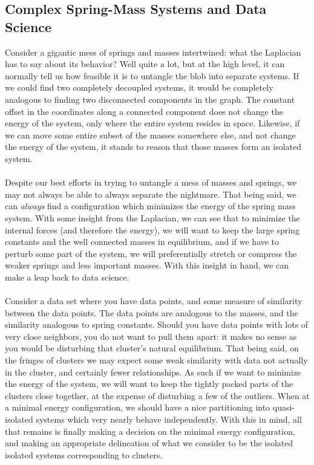 \subsection{Complex Spring-Mass Systems and Data Science}
Consider a gigantic mess of springs and masses intertwined: what the
Laplacian has to say about its behavior? Well quite a lot, but at the
high level, it can normally tell us how feasible it is to untangle the
blob into separate systems. If we could find two completely decoupled
systems, it would be completely analogous to finding two disconnected
components in the graph. The constant offset in the coordinates along
a connected component does not change the energy of the system, only
where the entire system resides in space. Likewise, if we can move
some entire subset of the masses somewhere else, and not change the
energy of the system, it stands to reason that those masses form an
isolated system.  
\\\\
Despite our best efforts in trying to untangle a mess of masses and
springs, we may not always be able to always separate the
nightmare. That being said, we can \textit{always} find a
configuration which minimizes the energy of the spring mass
system. With some insight from the Laplacian, we can see that to
minimize the internal forces (and therefore the energy), we will want
to keep the large spring constants and the well connected masses in
equilibrium, and if we have to perturb some part of the system, we
will preferentially stretch or compress the weaker springs and less
important masses. With this insight in hand, we can make a leap back
to data science. 
\\\\
Consider a data set where you have data points, and some measure of
similarity between the data points. The data points are analogous to
the masses, and the similarity analogous to spring constants. Should
you have data points with lots of very close neighbors, you do not
want to pull them apart: it makes no sense as you would be disturbing
that cluster's natural equilibrium. That being said, on the fringes of
clusters we may expect some weak similarity with data not actually in
the cluster, and certainly fewer relationships. As such if we want to
minimize the energy of the system, we will want to keep the tightly
packed parts of the clusters close together, at the expense of
disturbing a few of the outliers. When at a minimal energy
configuration, we should have a nice partitioning into quasi-isolated
systems which very nearly behave independently. With this in mind, all
that remains is finally making a decision on the minimal energy
configuration, and making an appropriate delineation of what we
consider to be the isolated isolated systems corresponding to
clusters.  

